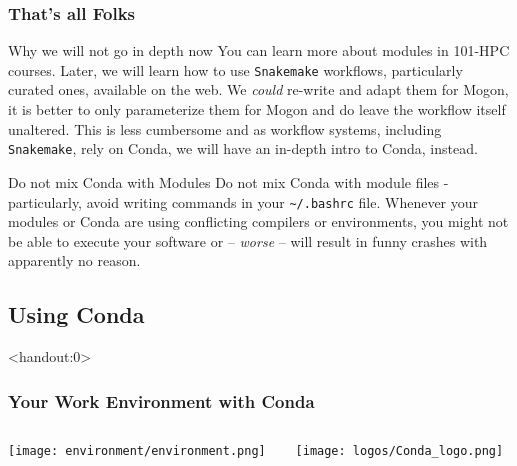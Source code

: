 \begin{frame}[fragile]
  \frametitle{That's all Folks}
   \vspace{-0.8em}
  \begin{alertblock}{Why we will not go in depth now}
You can learn more about modules in 101-HPC courses. Later, we will learn how to use \texttt{Snakemake} workflows, particularly curated ones, available on the web. We \emph{could} re-write and adapt them for Mogon, it is better to only parameterize them for Mogon and do leave the workflow itself unaltered. This is less cumbersome and as workflow systems, including \texttt{Snakemake}, rely on Conda, we will have an in-depth intro to Conda, instead.
  \end{alertblock}
  \vfill
  \begin{alertblock}{Do not mix Conda with Modules}
   Do not mix Conda with module files - particularly, avoid writing  commands in your \texttt{\textasciitilde/.bashrc} file.\newline
   Whenever your modules or Conda are using conflicting compilers or environments, you might not be able to execute your software or -- \emph{worse} -- will result in funny crashes with apparently no reason.
  \end{alertblock}

\end{frame}

\subsection{Using Conda}

\begin{frame}<handout:0> 
  \frametitle{Your Work Environment with Conda}
  \begin{columns}
    \begin{column}{0.5\textwidth}\centering
      \texttt{[image: environment/environment.png]}
    \end{column}
    \begin{column}{0.5\textwidth}\centering
      \texttt{[image: logos/Conda\_logo.png]}   
    \end{column}
  \end{columns}
\end{frame}

